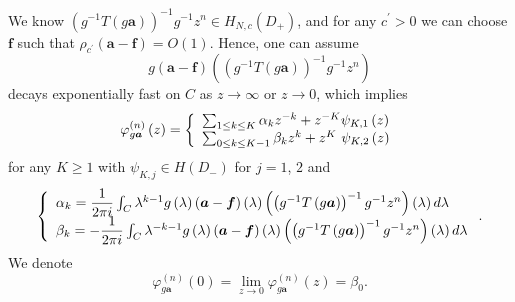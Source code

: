 \documentclass[a4paper]{article}%
\begin{document}
We know $\left(  g^{-1}T\left(  g\boldsymbol{a}\right)  \right)  ^{-1}%
g^{-1}z^{n}\in H_{N,c}\left(  D_{+}\right)  $, and for any $c^{\prime}>0$ we
can choose $\boldsymbol{f}$ such that $\rho_{c^{\prime}}\left(  \boldsymbol{a}%
-\boldsymbol{f}\right)  =O\left(  1\right)  $. Hence, one can assume
\[
g\left(  \boldsymbol{a}-\boldsymbol{f}\right)  \left(  \left(  g^{-1}T\left(
g\boldsymbol{a}\right)  \right)  ^{-1}g^{-1}z^{n}\right)
\]
decays exponentially fast on $C$ as $z\rightarrow\infty$ or $z\rightarrow0$,
which implies%
\begin{equation}
\varphi_{g\boldsymbol{a}}^{\left(  n\right)  }\left(  z\right)  =\left\{
\begin{array}
[c]{l}%
\sum_{1\leq k\leq K}\alpha_{k}z^{-k}+z^{-K}\psi_{K,1}\left(  z\right) \\
\sum_{0\leq k\leq K-1}\beta_{k}z^{k}+z^{K}\text{ }\psi_{K,2}\left(  z\right)
\end{array}
\right.  \label{2-20}%
\end{equation}
for any $K\geq1$ with $\psi_{K,j}\in H\left(  D_{-}\right)  $ for $j=1$, $2$
and
\[
\left\{
\begin{array}
[c]{l}%
\alpha_{k}=\dfrac{1}{2\pi i}\int_{C}\lambda^{k-1}g\left(  \lambda\right)
\left(  \boldsymbol{a}-\boldsymbol{f}\right)  \left(  \lambda\right)  \left(
\left(  g^{-1}T\left(  g\boldsymbol{a}\right)  \right)  ^{-1}g^{-1}%
z^{n}\right)  \left(  \lambda\right)  d\lambda\\
\beta_{k}=-\dfrac{1}{2\pi i}\int_{C}\lambda^{-k-1}g\left(  \lambda\right)
\left(  \boldsymbol{a}-\boldsymbol{f}\right)  \left(  \lambda\right)  \left(
\left(  g^{-1}T\left(  g\boldsymbol{a}\right)  \right)  ^{-1}g^{-1}%
z^{n}\right)  \left(  \lambda\right)  d\lambda
\end{array}
\right.  \text{.}%
\]
We denote%
\[
\varphi_{g\boldsymbol{a}}^{\left(  n\right)  }\left(  0\right)  =\lim
_{z\rightarrow0}\varphi_{g\boldsymbol{a}}^{\left(  n\right)  }\left(
z\right)  =\beta_{0}\text{.}%
\]
\end{document}
